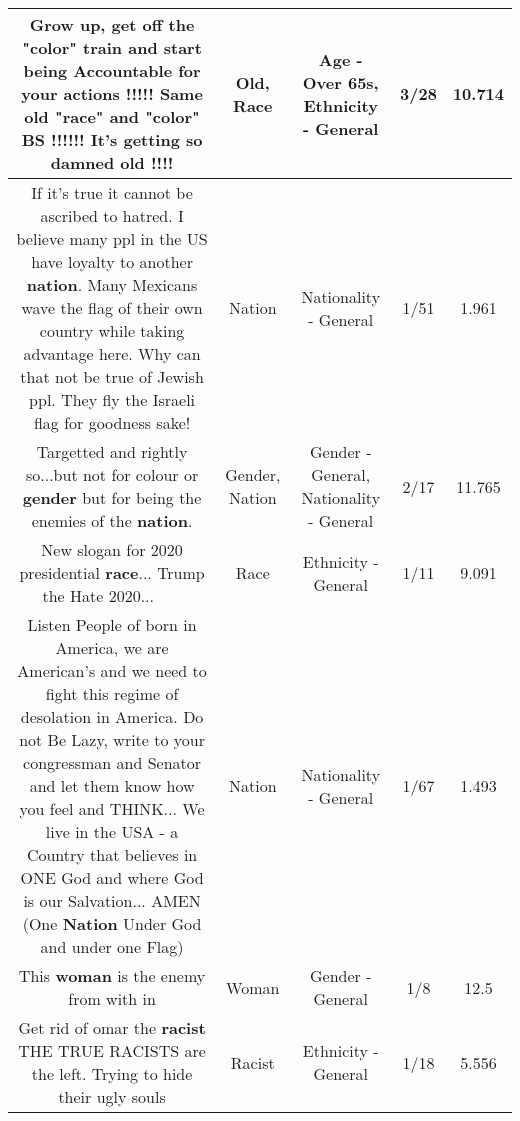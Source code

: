 \documentclass[11pt]{article}
\newlength\mylength
\begin{document}
\begin{center}
\begin{longtable}{|C{.65\mylength}|C{.30\mylength}|C{.12\mylength}|C{.12\mylength}|C{.12\mylength}|}
  \small Grow up, get off the "color" train and start being Accountable for your actions !!!!! Same \textbf{old} "\textbf{race}" and "color" BS !!!!!! It's getting so damned \textbf{old} !!!!\normalsize   & Old, Race & Age - Over 65s, Ethnicity - General & 3/28 & 10.714 \\  \hline
  \small If it's true it cannot be ascribed to hatred. I believe many ppl in the US have loyalty to another \textbf{nation}. Many Mexicans wave the flag of their own country while taking advantage here. Why can that not be true of Jewish ppl. They fly the Israeli flag for goodness sake!\normalsize   & Nation & Nationality - General & 1/51 & 1.961 \\  \hline
  \small Targetted and rightly so...but not for colour or \textbf{gender} but for being the enemies of the \textbf{nation}.\normalsize   & Gender, Nation & Gender - General, Nationality - General & 2/17 & 11.765 \\  \hline
  \small New slogan for 2020 presidential \textbf{race}... Trump the Hate 2020... 🤘🏽🚀🕺🏽\normalsize   & Race & Ethnicity - General & 1/11 & 9.091 \\  \hline
  \small Listen People of born in America, we are American's and we need to fight this regime of desolation in America.  Do not Be Lazy, write to your congressman and Senator and let them know how you feel and THINK...    We live in the USA -  a Country that believes in ONE God and  where God is our Salvation... AMEN     (One \textbf{Nation} Under God and under one Flag)\normalsize   & Nation & Nationality - General & 1/67 & 1.493 \\  \hline
  \small This \textbf{woman} is the enemy from with in\normalsize   & Woman & Gender - General & 1/8 & 12.5 \\  \hline
  \small Get rid of omar the \textbf{racist} THE TRUE RACISTS  are the left. Trying to hide their ugly souls\normalsize   & Racist & Ethnicity - General & 1/18 & 5.556 \\  \hline

\end{longtable}
\end{center}
\end{document}
